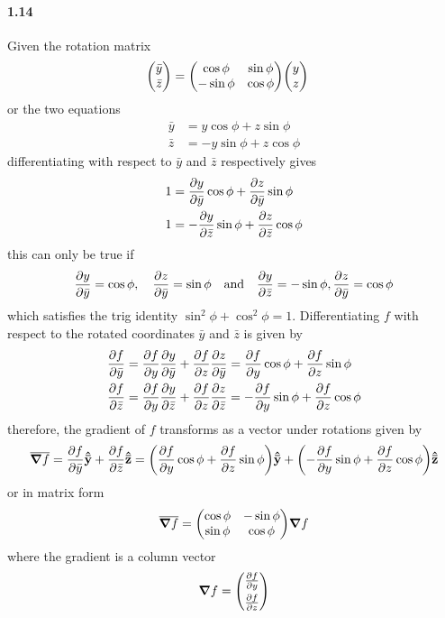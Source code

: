 \documentclass[../main.tex]{subfiles}
\begin{document}
\paragraph{1.14}
Given the rotation matrix
\begin{align*}
    \mqty(\bar{y} \\ \bar{z}) &= \mqty(\cos\phi & \sin\phi \\ -\sin\phi & \cos\phi)
    \mqty(y \\ z)
\end{align*}
or the two equations
\begin{align*}
    \bar{y} &= y \cos\phi + z \sin\phi \\
    \bar{z} &= -y \sin\phi + z \cos\phi
\end{align*}
differentiating with respect to $\bar{y}$ and $\bar{z}$ respectively gives
\begin{align*}
    1 &= \pdv{y}{\bar{y}}\cos\phi + \pdv{z}{\bar{y}}\sin\phi \\
    1 &= -\pdv{y}{\bar{z}}\sin\phi + \pdv{z}{\bar{z}}\cos\phi
\end{align*}
this can only be true if
\begin{align*}
    \pdv{y}{\bar{y}} = \cos\phi     ,\quad      \pdv{z}{\bar{y}} = \sin\phi
    \qand \pdv{y}{\bar{z}} = -\sin\phi      ,       \pdv{z}{\bar{y}} = \cos\phi
\end{align*}
which satisfies the trig identity $\sin^2\phi + \cos^2\phi = 1$. Differentiating $f$ with respect to
the rotated coordinates $\bar{y}$ and $\bar{z}$ is given by
\begin{align*}
    \pdv{f}{\bar{y}} &= \pdv{f}{y} \pdv{y}{\bar{y}} + \pdv{f}{z} \pdv{z}{\bar{y}}
    = \pdv{f}{y} \cos\phi + \pdv{f}{z} \sin\phi \\
    \pdv{f}{\bar{z}} &= \pdv{f}{y} \pdv{y}{\bar{z}} + \pdv{f}{z} \pdv{z}{\bar{z}}
    = -\pdv{f}{y} \sin\phi + \pdv{f}{z} \cos\phi
\end{align*}
therefore, the gradient of $f$ transforms as a vector under rotations given by
\begin{align*}
    \overline{\grad{f}} = \pdv{f}{\bar{y}} \vu{\bar{y}} + \pdv{f}{\bar{z}} \vu{\bar{z}}
    = \quantity(\pdv{f}{y} \cos\phi + \pdv{f}{z} \sin\phi) \vu{\bar{y}}
    + \quantity(-\pdv{f}{y} \sin\phi + \pdv{f}{z} \cos\phi) \vu{\bar{z}}
\end{align*}
or in matrix form
\begin{align*}
    \overline{\grad{f}} = \mqty(\cos\phi & -\sin\phi \\ \sin\phi & \cos\phi) \grad{f}
\end{align*}
where the gradient is a column vector
\begin{align*}
    \grad{f} = \begin{pmatrix}
        \pdv{f}{y} \\[1ex] \pdv{f}{z}
    \end{pmatrix}
\end{align*}
\end{document}
